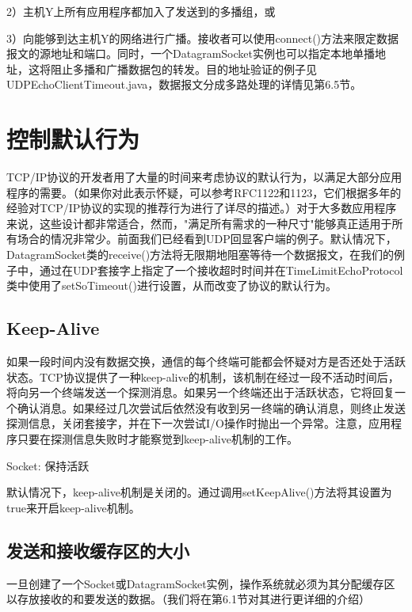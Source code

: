 		2）主机Y上所有应用程序都加入了发送到的多播组，或

		3）向能够到达主机Y的网络进行广播。接收者可以使用connect()方法来限定数据报文的源地址和端口。同时，一个DatagramSocket实例也可以指定本地单播地址，这将阻止多播和广播数据包的转发。目的地址验证的例子见UDPEchoClientTimeout.java，数据报文分成多路处理的详情见第6.5节。 

\section{控制默认行为}

	TCP/IP协议的开发者用了大量的时间来考虑协议的默认行为，以满足大部分应用程序的需要。（如果你对此表示怀疑，可以参考RFC1122和1123，它们根据多年的经验对TCP/IP协议的实现的推荐行为进行了详尽的描述。）对于大多数应用程序来说，这些设计都非常适合，然而，"满足所有需求的一种尺寸"能够真正适用于所有场合的情况非常少。前面我们已经看到UDP回显客户端的例子。默认情况下，DatagramSocket类的receive()方法将无限期地阻塞等待一个数据报文，在我们的例子中，通过在UDP套接字上指定了一个接收超时时间并在TimeLimitEchoProtocol类中使用了setSoTimeout()进行设置，从而改变了协议的默认行为。 

	\subsection{Keep-Alive} 

		如果一段时间内没有数据交换，通信的每个终端可能都会怀疑对方是否还处于活跃状态。TCP协议提供了一种keep-alive的机制，该机制在经过一段不活动时间后，将向另一个终端发送一个探测消息。如果另一个终端还出于活跃状态，它将回复一个确认消息。如果经过几次尝试后依然没有收到另一终端的确认消息，则终止发送探测信息，关闭套接字，并在下一次尝试I/O操作时抛出一个异常。注意，应用程序只要在探测信息失败时才能察觉到keep-alive机制的工作。 

		Socket: 保持活跃 

		

		默认情况下，keep-alive机制是关闭的。通过调用setKeepAlive()方法将其设置为true来开启keep-alive机制。 

	\subsection{发送和接收缓存区的大小} 

		一旦创建了一个Socket或DatagramSocket实例，操作系统就必须为其分配缓存区以存放接收的和要发送的数据。（我们将在第6.1节对其进行更详细的介绍）

